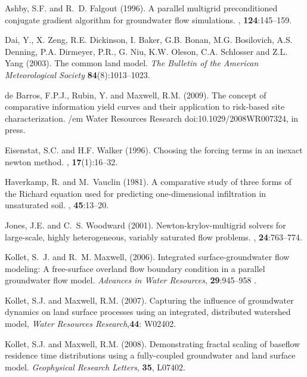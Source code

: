 \begin{thebibliography}{99}

Ashby, S.F. and R.~D. Falgout (1996).
\newblock A parallel multigrid preconditioned conjugate gradient algorithm for
  groundwater flow simulations.
, {\bf 124}:145--159.

Dai, Y., X. Zeng, R.E. Dickinson, I. Baker, G.B. Bonan, M.G. Bosilovich, A.S. Denning, P.A. Dirmeyer, P.R., G. Niu, K.W. Oleson, C.A. Schlosser and Z.L. Yang (2003). The common land model. {\em The Bulletin of the American Meteorological Society} {\bf 84}(8):1013--1023.

de Barros, F.P.J., Rubin, Y. and Maxwell, R.M. (2009). The concept of comparative information yield curves and their application to risk-based site characterization. {/em Water Resources Research} doi:10.1029/2008WR007324, in press.

Eisenstat, S.C. and H.F. Walker (1996).
\newblock Choosing the forcing terms in an inexact newton method.
, {\bf 17}(1):16--32.

Haverkamp, R. and M.~Vauclin (1981).
\newblock A comparative study of three forms of the {R}ichard equation used for
  predicting one-dimensional infiltration in unsaturated soil.
, {\bf 45}:13--20.


Jones, J.E. and C.~S. Woodward (2001).
\newblock Newton-krylov-multigrid solvers for large-scale, highly heterogeneous, variably saturated flow problems.
, {\bf 24}:763--774.

Kollet, S.~J. and R.~M. Maxwell, (2006). Integrated
surface-groundwater flow
  modeling: A free-surface overland flow boundary condition in a parallel
  groundwater flow model. {\em Advances in Water Resources}, {\bf 29}:945--958 .

Kollet, S.J. and Maxwell, R.M. (2007). Capturing the influence of groundwater dynamics on land surface processes using an integrated, distributed watershed model, { \em Water Resources Research},{\bf 44}: W02402.

Kollet, S.J. and Maxwell, R.M. (2008). Demonstrating fractal scaling of baseflow residence time distributions using a fully-coupled groundwater and land surface model. {\em Geophysical Research Letters}, {\bf 35}, L07402. 


\end{thebibliography}
